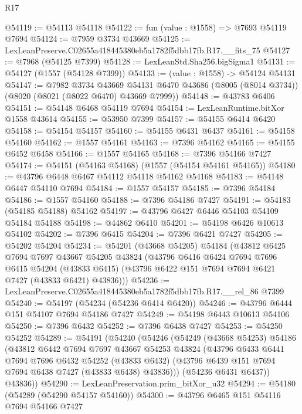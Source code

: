 \begin{lexlean}{R17}
\begin{coremodule}
@54119 := @54113 @54118
@54122 := fun (value : @1558) => @7693 @54119 @7694
@54124 := @7959 @3734 @43669
@54125 := LexLeanPreserve.C02655a418445380eb5a1782f5dbb17fb.R17.__fits_75
@54127 := @7968 (@54125 @7399)
@54128 := LexLeanStd.Sha256.bigSigma1
@54131 := @54127 (@1557 (@54128 @7399))
@54133 := (value : @1558) -> @54124 @54131
@54147 := @7982
    @3734
    @43669
    @54131
    @6470
    @43686
    (@8005 (@8014 @3734))
    (@8020 (@8021 (@8022 @6470) @43669 @7999))
@54148 := @43783 @6406
@54151 := @54148 @6468 @54119 @7694
@54154 := LexLeanRuntime.bitXor @1558 @43614
@54155 := @53950 @7399
@54157 := @54155 @6414 @6420
@54158 := @54154 @54157
@54160 := @54155 @6431 @6437
@54161 := @54158 @54160
@54162 := @1557 @54161
@54163 := @7396 @54162
@54165 := @54155 @6452 @6458
@54166 := @1557 @54165
@54168 := @7396 @54166 @7427
@54174 := @54151 (@54163 @54168) (@1557 (@54154 @54161 @54165))
@54180 := @43796 @6448 @6467 @54112 @54118 @54162 @54168
@54183 := @54148 @6447 @54110 @7694
@54184 := @1557 @54157
@54185 := @7396 @54184
@54186 := @1557 @54160
@54188 := @7396 @54186 @7427
@54191 := @54183 (@54185 @54188) @54162
@54197 := @43796 @6427 @6446 @54103 @54109 @54184 @54188
@54198 := @44862 @6410
@54201 := @54198 @6426 @10613 @54102
@54202 := @7396 @6415
@54204 := @7396 @6421 @7427
@54205 := @54202 @54204
@54234 := @54201
    (@43668 @54205)
    @54184
    (@43812
      @6425
      @7694
      @7697
      @43667
      @54205
      @43824
      (@43796
        @6416
        @6424
        @7694
        @7696
        @6415
        @54204
        (@43833 @6415)
        (@43796 @6422 @151 @7694 @7694 @6421 @7427 (@43833 @6421) @43836)))
@54236 := LexLeanPreserve.C02655a418445380eb5a1782f5dbb17fb.R17.__rel_86 @7399
@54240 := @54197 (@54234 (@54236 @6414 @6420))
@54246 := @43796 @6444 @151 @54107 @7694 @54186 @7427
@54249 := @54198 @6443 @10613 @54106
@54250 := @7396 @6432
@54252 := @7396 @6438 @7427
@54253 := @54250 @54252
@54289 := @54191
    (@54240
      (@54246
        (@54249
          (@43668 @54253)
          @54186
          (@43812
            @6442
            @7694
            @7697
            @43667
            @54253
            @43824
            (@43796
              @6433
              @6441
              @7694
              @7696
              @6432
              @54252
              (@43833 @6432)
              (@43796 @6439 @151 @7694 @7694 @6438 @7427 (@43833 @6438) @43836)))
          (@54236 @6431 @6437))
        @43836))
@54290 := LexLeanPreservation.prim_bitXor_u32
@54294 := @54180 (@54289 (@54290 @54157 @54160))
@54300 := @43796 @6465 @151 @54116 @7694 @54166 @7427

\end{coremodule}
\end{lexlean}
